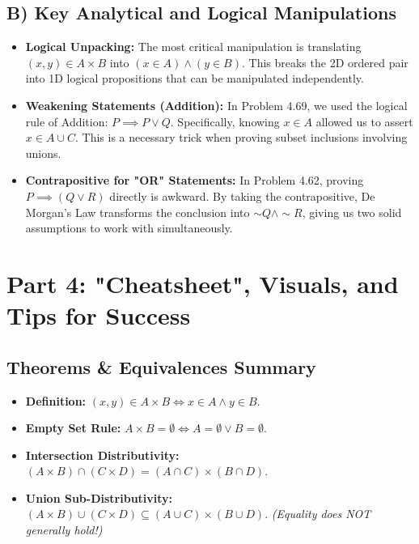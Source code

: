 \documentclass[11pt]{article}
\begin{document}
\subsection{B) Key Analytical and Logical Manipulations}
\begin{itemize}
    \item \textbf{Logical Unpacking:} The most critical manipulation is translating $(x, y) \in A \times B$ into $(x \in A) \land (y \in B)$. This breaks the 2D ordered pair into 1D logical propositions that can be manipulated independently.
    \item \textbf{Weakening Statements (Addition):} In Problem 4.69, we used the logical rule of Addition: $P \implies P \lor Q$. Specifically, knowing $x \in A$ allowed us to assert $x \in A \cup C$. This is a necessary trick when proving subset inclusions involving unions.
    \item \textbf{Contrapositive for "OR" Statements:} In Problem 4.62, proving $P \implies (Q \lor R)$ directly is awkward. By taking the contrapositive, De Morgan's Law transforms the conclusion into $\sim Q \land \sim R$, giving us two solid assumptions to work with simultaneously.
\end{itemize}

\section{Part 4: "Cheatsheet", Visuals, and Tips for Success}

\subsection{Theorems \& Equivalences Summary}
\begin{itemize}
    \item \textbf{Definition:} $(x, y) \in A \times B \iff x \in A \land y \in B$.
    \item \textbf{Empty Set Rule:} $A \times B = \emptyset \iff A = \emptyset \lor B = \emptyset$.
    \item \textbf{Intersection Distributivity:} $(A \times B) \cap (C \times D) = (A \cap C) \times (B \cap D)$.
    \item \textbf{Union Sub-Distributivity:} $(A \times B) \cup (C \times D) \subseteq (A \cup C) \times (B \cup D)$. \textit{(Equality does NOT generally hold!)}
\end{itemize}
\end{document}
